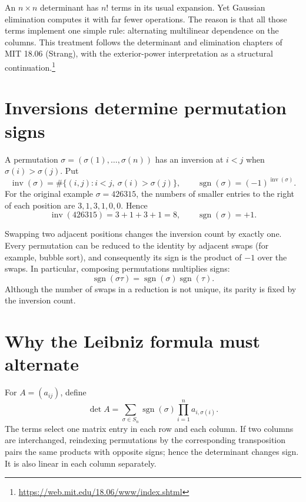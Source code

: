 
An \(n\times n\) determinant has \(n!\) terms in its usual expansion. Yet Gaussian elimination computes it with far fewer operations. The reason is that all those terms implement one simple rule: alternating multilinear dependence on the columns. This treatment follows the determinant and elimination chapters of MIT 18.06 (Strang), with the exterior-power interpretation as a structural continuation.\footnote{\url{https://web.mit.edu/18.06/www/index.shtml}}

\section{Inversions determine permutation signs}

A permutation \(\sigma=(\sigma(1),\ldots,\sigma(n))\) has an inversion at \(i<j\) when \(\sigma(i)>\sigma(j)\). Put
\[
 \operatorname{inv}(\sigma)=\#\{(i,j):i<j,\ \sigma(i)>\sigma(j)\},\qquad
 \operatorname{sgn}(\sigma)=(-1)^{\operatorname{inv}(\sigma)}.
\]
For the original example \(\sigma=426315\), the numbers of smaller entries to the right of each position are \(3,1,3,1,0,0\). Hence
\[
 \operatorname{inv}(426315)=3+1+3+1=8,
 \qquad\operatorname{sgn}(\sigma)=+1.
\]

Swapping two adjacent positions changes the inversion count by exactly one. Every permutation can be reduced to the identity by adjacent swaps (for example, bubble sort), and consequently its sign is the product of \(-1\) over the swaps. In particular, composing permutations multiplies signs:
\[
 \operatorname{sgn}(\sigma\tau)
 =\operatorname{sgn}(\sigma)\operatorname{sgn}(\tau).
\]
Although the number of swaps in a reduction is not unique, its parity is fixed by the inversion count.

\section{Why the Leibniz formula must alternate}

For \(A=(a_{ij})\), define
\[
 \det A=\sum_{\sigma\in S_n}\operatorname{sgn}(\sigma)
 \prod_{i=1}^n a_{i,\sigma(i)}.
\]
The terms select one matrix entry in each row and each column. If two columns are interchanged, reindexing permutations by the corresponding transposition pairs the same products with opposite signs; hence the determinant changes sign. It is also linear in each column separately.

